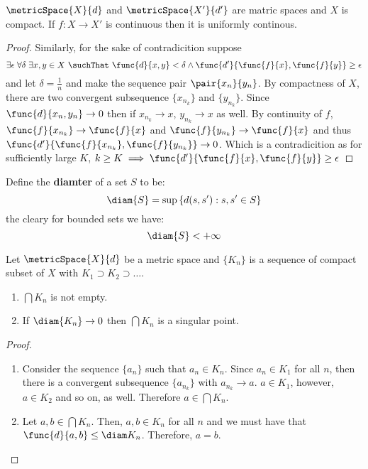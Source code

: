 \begin{proposition}
    \(\metricSpace{X}{d}\) and \(\metricSpace{X'}{d'}\) are matric spaces and \(X\) is compact. If \(f: X \to X'\) is continuous then it is uniformly continous.
\end{proposition}

\begin{proof}
    Similarly, for the sake of contradicition suppose
    \begin{equation*}
        \exists \epsilon \; \forall \delta \; \exists x,y \in X \ \suchThat \ \func{d}{x,y} < \delta \land \func{d'}{\func{f}{x}, \func{f}{y}} \geq \epsilon
    \end{equation*}
    and let \(\delta = \frac{1}{n}\) and make the sequence pair \(\pair{x_n}{y_n}\). By compactness of \(X\), there are two convergent subsequence \(\{x_{n_k}\}\) and \(\{y_{n_k}\}\). Since \(\func{d}{x_n,y_n} \to 0\) then if \(x_{n_k} \to x\), \(y_{n_k} \to x\) as well. By continuity of \(f\), \(\func{f}{x_{n_k}} \to \func{f}{x}\) and \(\func{f}{y_{n_k}} \to \func{f}{x}\) and thus \(\func{d'}{\func{f}{x_{n_k}}, \func{f}{y_{n_k}}} \to 0 \). Which is a contradicition as for sufficiently large \(K\), \(k \geq K \implies \func{d'}{\func{f}{x}, \func{f}{y}} \geq \epsilon\)
\end{proof}

Define the \textbf{diamter} of a set \(S\) to be:
\[\diam{S} = \sup{\{d(s,s') : s,s' \in S\}}\]
the cleary for bounded sets we have:
\[\diam{S} < +\infty\]

\begin{proposition}
    Let \(\metricSpace{X}{d}\) be a metric space and \(\{K_n\}\) is a sequence of compact subset of \(X\) with \(K_1 \supset K_2 \supset \dots\).
    \begin{enumerate}
        \item \(\bigcap K_n\) is not empty.
        \item If \(\diam{K_n} \to 0\) then \(\bigcap K_n\) is a singular point.
    \end{enumerate}
\end{proposition}

\begin{proof} \leavevmode
    \begin{enumerate}
        \item Consider the sequence \(\{a_n\}\) such that \(a_n \in K_n\). Since \(a_n \in K_1\) for all \(n\), then there is a convergent subsequence \(\{a_{n_k}\}\) with \(a_{n_k} \to a\). \(a \in K_1\), however, \(a \in K_2\) and so on, as well. Therefore \(a \in \bigcap K_n\).
        \item Let \(a,b \in \bigcap K_n\). Then, \(a,b \in K_n\) for all \(n\) and we must have that \(\func{d}{a,b} \leq \diam K_n\). Therefore, \(a = b \).
    \end{enumerate}
\end{proof}

